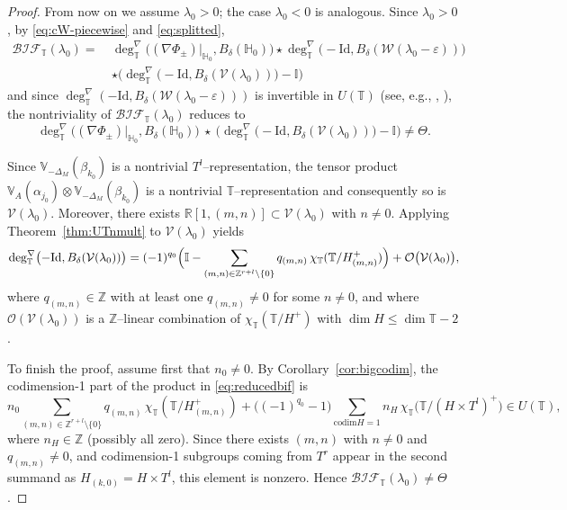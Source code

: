 \documentclass[reqno,twoside,12pt]{amsart}
\newcommand{\bH}{\mathbb{H}}
\newcommand{\bI}{\mathbb{I}}
\newcommand{\bR}{\mathbb{R}}
\newcommand{\bT}{\mathbb{T}}
\newcommand{\bV}{\mathbb{V}}
\newcommand{\cO}{\mathcal{O}}
\newcommand{\cV}{\mathcal{V}}
\newcommand{\cW}{\mathcal{W}}
\numberwithin{equation}{section} \errorcontextlines=0
\newcommand{\codim}{\mathrm{ codim  }}
\newcommand{\bif}{\mathcal{BIF}}
\begin{document}
\begin{proof}
From now on we assume $\lambda_0>0$; the case $\lambda_0<0$ is analogous.
Since $\lambda_0>0$, by \eqref{eq:cW-piecewise} and \eqref{eq:splitted},
\begin{equation}\label{eq:bifind-final}
\begin{aligned}
\bif_{\bT}(\lambda_{0})=\ &
\deg^{\nabla}_{\bT}\bigl((\nabla\Phi_{\pm})|_{\bH_0},B_{\delta}(\bH_0)\bigr)\star
\deg^{\nabla}_{\bT}\bigl(-\mathrm{Id},B_{\delta}(\cW(\lambda_{0}-\varepsilon))\bigr)
\\
&\star\bigl(\deg^{\nabla}_{\bT}\bigl(-\mathrm{Id},B_{\delta}(\cV(\lambda_{0}))\bigr)-\bI\bigr)
\end{aligned}
\end{equation}
and since $\deg^{\nabla}_{\bT}(-\mathrm{Id},B_{\delta}(\cW(\lambda_{0}-\varepsilon)))$ is invertible in $U(\bT)$ (see, e.g., \cite[Thm.~3.11]{GeRy}, \cite[Thm.~2.1]{GolRyb1}), the nontriviality of $\bif_{\bT}(\lambda_{0})$ reduces to
\begin{equation}\label{eq:reducedbif}
\deg^{\nabla}_{\bT}\bigl((\nabla\Phi_{\pm})|_{\bH_0},B_{\delta}(\bH_0)\bigr)
\ \star\
\bigl(\deg^{\nabla}_{\bT}\bigl(-\mathrm{Id},B_{\delta}(\cV(\lambda_{0}))\bigr)-\bI\bigr)
\ne \Theta.
\end{equation}

Since $\bV_{-\Delta_{M}}(\beta_{k_{0}})$ is a nontrivial $T^{l}$–representation, the tensor product $\bV_{A}(\alpha_{j_{0}})\otimes\bV_{-\Delta_{M}}(\beta_{k_{0}})$ is a nontrivial $\bT$–representation and consequently so is $\cV(\lambda_{0})$. Moreover, there exists $\bR[1,(m,n)]\subset\cV(\lambda_{0})$ with $n\neq 0$. Applying Theorem~\ref{thm:UTnmult} to $\cV(\lambda_{0})$ yields
\[
\deg^{\nabla}_{\bT}\bigl(-\mathrm{Id},B_{\delta}(\cV(\lambda_{0}))\bigr)
=(-1)^{q_{0}}\Bigl(\bI-\sum_{(m,n)\in\mathbb{Z}^{r+l}\setminus\{0\}} q_{(m,n)}\,\chi_{\bT}(\bT/H_{(m,n)}^{+})\Bigr)
+\cO\bigl(\cV(\lambda_{0})\bigr),
\]
where $q_{(m,n)}\in\mathbb{Z}$ with at least one $q_{(m,n)}\neq 0$ for some $n\neq 0$, and where $\cO(\cV(\lambda_{0}))$ is a $\mathbb{Z}$–linear combination of $\chi_{\bT}(\bT/H^{+})$ with $\dim H\le \dim\bT-2$.

To finish the proof, assume first that $n_{0}\ne 0$. By Corollary~\ref{cor:bigcodim}, the codimension-1 part of the product in \eqref{eq:reducedbif} is
\[
n_{0}\sum_{(m,n)\in\mathbb{Z}^{r+l}\setminus\{0\}} q_{(m,n)}\,\chi_{\bT}(\bT/H_{(m,n)}^{+})
+\bigl((-1)^{q_{0}}-1\bigr)\sum_{  \codim H=1 } n_{H}\,\chi_{\bT}\bigl(\bT/(H\times T^{l})^{+}\bigr)\in U(\bT),
\]
where $n_{H}\in\mathbb{Z}$ (possibly all zero). Since there exists $(m,n)$ with $n\ne 0$ and $q_{(m,n)}\ne 0$, and codimension-1 subgroups coming from $T^{r}$ appear in the second summand as $H_{(k,0)}=H\times T^{l}$, this element is nonzero. Hence $\bif_{\bT}(\lambda_{0})\ne\Theta$.


\end{proof}
\end{document}
